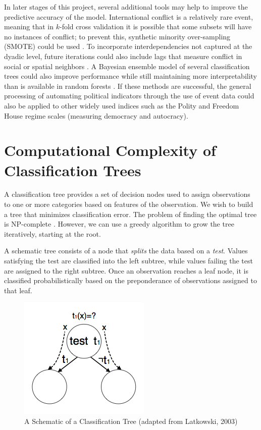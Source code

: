 \documentclass[12pt,letterpaper]{article}
\begin{document}
In later stages of this project, several additional tools may help to improve the predictive accuracy of the model. International conflict is a relatively rare event, meaning that in $k$-fold cross validation it is possible that some subsets will have no instances of conflict; to prevent this, synthetic minority over-sampling (SMOTE) could be used \citep{chawla2002smote}. To incorporate interdependencies not captured at the dyadic level, future iterations could also include lags that measure conflict in social or spatial neighbors \citep{gleditsch2000war,gleditsch2001measuring,hoff2004modeling,ward1998democratizing,ward2007disputes,ward2011network}. A Bayesian ensemble model of several classification trees could also improve performance while still maintaining more interpretability than is available in random forests \citep{arva2013improving,montgomery2012improving,Raftery:1995,raftery2005using}. If these methods are successful, the general processing of automating political indicators through the use of event data could also be applied to other widely used indices such as the Polity and Freedom House regime scales (measuring democracy and autocracy). 


\section{Computational Complexity of Classification Trees}
\label{complexity}

A classification tree provides a set of decision nodes used to assign observations to one or more categories based on features of the observation. We wish to build a tree that minimizes classification error. The problem of finding the optimal tree is NP-complete \citep{mohri2012foundations}. However, we can use a greedy algorithm to grow the tree iteratively, starting at the root. 

A schematic tree consists of a node that \emph{splits} the data based on a \emph{test}. Values satisfying the test are classified into the left subtree, while values failing the test are assigned to the right subtree. Once an observation reaches a leaf node, it is classified probabilistically based on the preponderance of observations assigned to that leaf. 

\begin{figure}
  \begin{center}
    \includegraphics{../graphics/tree-schematic.png}
    \caption{A Schematic of a Classification Tree (adapted from Latkowski, 2003)}
    \label{tree}
  \end{center}
\end{figure}
\end{document}
